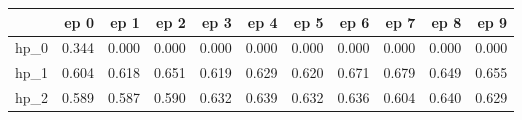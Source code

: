 \begin{tabular}{lrrrrrrrrrr}
\toprule
{} &   ep 0 &   ep 1 &   ep 2 &   ep 3 &   ep 4 &   ep 5 &   ep 6 &   ep 7 &   ep 8 &   ep 9 \\
\midrule
hp\_0 &  0.344 &  0.000 &  0.000 &  0.000 &  0.000 &  0.000 &  0.000 &  0.000 &  0.000 &  0.000 \\
hp\_1 &  0.604 &  0.618 &  0.651 &  0.619 &  0.629 &  0.620 &  0.671 &  0.679 &  0.649 &  0.655 \\
hp\_2 &  0.589 &  0.587 &  0.590 &  0.632 &  0.639 &  0.632 &  0.636 &  0.604 &  0.640 &  0.629 \\
\bottomrule
\end{tabular}
